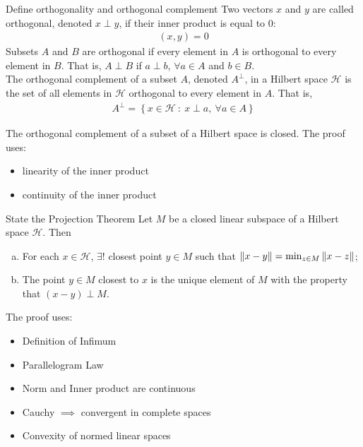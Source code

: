 \documentclass[avery5388,grid,frame]{flashcards}
\def\hilb{\mathcal{H}}
\begin{document}
\begin{flashcard}
    {Define orthogonality and orthogonal complement}
    Two vectors $x$ and $y$ are called orthogonal, denoted $x \perp y$, if their inner product is equal to $0$:
    \begin{align*}
        (x,y) = 0
    \end{align*}
    Subsets $A$ and $B$ are orthogonal if every element in $A$ is orthogonal to every element in $B$.  That is, $A \perp B$ if $a \perp b$, $\forall a \in A$ and $b \in B$. \\

    The orthogonal complement of a subset $A$, denoted $A^\perp$, in a Hilbert space $\hilb$ is the set of all elements in $\hilb$ orthogonal to every element in $A$.  That is,
    \begin{align*}
        A^\perp = \left\{x \in \hilb\ :\ x \perp a,\ \forall a \in A\right\}
    \end{align*}
\end{flashcard}

\begin{flashcard}
    {The orthogonal complement of a subset of a Hilbert space is closed.}
    The proof uses:
    \begin{itemize}
        \item linearity of the inner product
        \item continuity of the inner product
    \end{itemize}
\end{flashcard}

\begin{flashcard}
    {State the Projection Theorem}
    Let $M$ be a closed linear subspace of a Hilbert space $\hilb$.  Then
    \begin{enumerate}[(a)]
        \item For each $x \in \hilb$, $\exists!$ closest point $y \in M$ such that $\norm{x - y} = \min_{z \in M}\norm{x - z}$;
        \item The point $y \in M$ closest to $x$ is the unique element of $M$ with the property that $(x - y) \perp M$.
    \end{enumerate}

    The proof uses:
    \begin{itemize}
        \setlength{\itemsep}{2pt}
        \item Definition of Infimum
        \item Parallelogram Law
        \item Norm and Inner product are continuous
        \item Cauchy $\implies$ convergent in complete spaces
        \item Convexity of normed linear spaces
    \end{itemize}
\end{flashcard}
\end{document}
